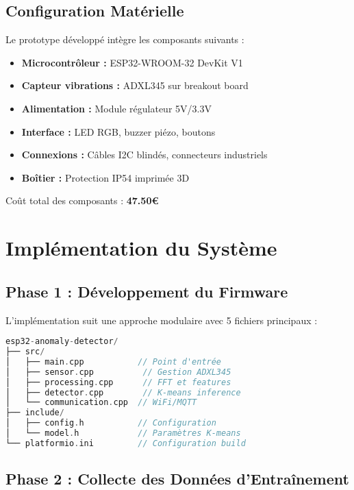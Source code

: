 \subsection{Configuration Matérielle}

Le prototype développé intègre les composants suivants :

\begin{itemize}
    \item \textbf{Microcontrôleur :} ESP32-WROOM-32 DevKit V1
    \item \textbf{Capteur vibrations :} ADXL345 sur breakout board
    \item \textbf{Alimentation :} Module régulateur 5V/3.3V
    \item \textbf{Interface :} LED RGB, buzzer piézo, boutons
    \item \textbf{Connexions :} Câbles I2C blindés, connecteurs industriels
    \item \textbf{Boîtier :} Protection IP54 imprimée 3D
\end{itemize}

Coût total des composants : \textbf{47.50€}

\section{Implémentation du Système}

\subsection{Phase 1 : Développement du Firmware}

L'implémentation suit une approche modulaire avec 5 fichiers principaux :

\begin{lstlisting}[language=C, caption=Structure du projet firmware]
esp32-anomaly-detector/
├── src/
│   ├── main.cpp           // Point d'entrée
│   ├── sensor.cpp          // Gestion ADXL345
│   ├── processing.cpp      // FFT et features
│   ├── detector.cpp        // K-means inference
│   └── communication.cpp  // WiFi/MQTT
├── include/
│   ├── config.h           // Configuration
│   └── model.h            // Paramètres K-means
└── platformio.ini         // Configuration build
\end{lstlisting}

\subsection{Phase 2 : Collecte des Données d'Entraînement}

